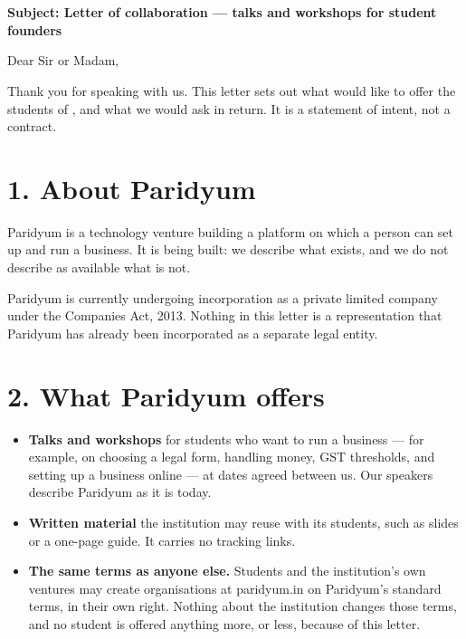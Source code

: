 \documentclass{paridyum}
\begin{document}
\paridyumletterhead
\paridyumdateref{\dkDocDate}{\dkDocRef}
\paridyumverifiable{\dkDocVerify}

\textbf{\dkCOffice} \\
\dkCLegalName \\
\dkCAddress

\vspace{0.9em}
\textbf{Subject: Letter of collaboration --- talks and workshops for student founders}

\vspace{0.7em}
Dear Sir or Madam,

\vspace{0.4em}
Thank you for speaking with us. This letter sets out what \textbf{\dkOrgName} would like to offer
the students of \dkCLegalName, and what we would ask in return. It is a statement of intent, not a
contract.

\section*{1. About Paridyum}
Paridyum is a technology venture building a platform on which a person can set up and run a
business. It is being built: we describe what exists, and we do not describe as available what
is not.

Paridyum is currently undergoing incorporation as a private limited company under the Companies
Act, 2013. Nothing in this letter is a representation that Paridyum has already been
incorporated as a separate legal entity.

\section*{2. What Paridyum offers}
\begin{itemize}[leftmargin=*, noitemsep]
    \item \textbf{Talks and workshops} for students who want to run a business --- for example,
          on choosing a legal form, handling money, GST thresholds, and setting up a business
          online --- at dates agreed between us. Our speakers describe Paridyum as it is today.
    \item \textbf{Written material} the institution may reuse with its students, such as slides
          or a one-page guide. It carries no tracking links.
    \item \textbf{The same terms as anyone else.} Students and the institution's own ventures may
          create organisations at paridyum.in on Paridyum's standard terms, in their own right.
          Nothing about the institution changes those terms, and no student is offered anything
          more, or less, because of this letter.
\end{itemize}
\end{document}
